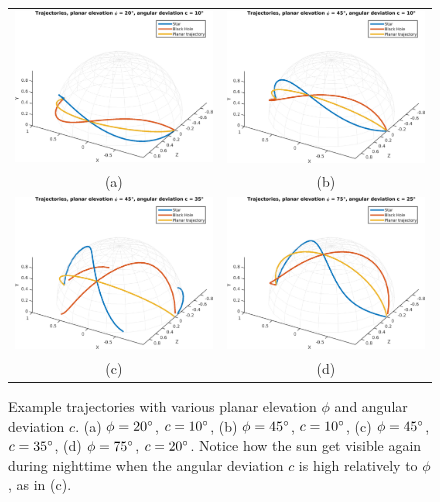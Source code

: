 \documentclass{report}
\begin{document}
\begin{figure}
  \centering
  \begin{tabular}{cc}
  \includegraphics[width=0.45\linewidth]{q4_trajectory_el20_dev10.png} &
  \includegraphics[width=0.45\linewidth]{q4_trajectory_el45_dev10.png} \\ \vspace{1em}
  (a) & (b) \\
  \includegraphics[width=0.45\linewidth]{q4_trajectory_el45_dev35.png} &
  \includegraphics[width=0.45\linewidth]{q4_trajectory_el75_dev25.png} \\
  (c) & (d)
  \end{tabular}
  \caption[Example trajectories]
   {Example trajectories with various planar elevation $\phi$ and angular deviation $c$. (a) $\phi = 20\degree$, $c = 10\degree$, (b) $\phi = 45\degree$, $c = 10\degree$, (c) $\phi = 45\degree$, $c = 35\degree$, (d) $\phi = 75\degree$, $c = 20\degree$. Notice how the sun get visible again during nighttime when the angular deviation $c$ is high relatively to $\phi$, as in (c).}
  \label{q4:trajectories}
\end{figure}
\end{document}
